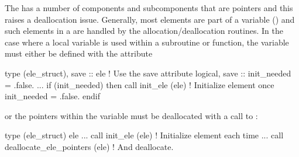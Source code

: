 The  has a number of components and subcomponents 
that are pointers and this raises a deallocation issue.
Generally, most  elements are part of a 
variable ()
and such elements in a  are handled by the
 allocation/deallocation routines. 
In the case where a local 
variable is used within a subroutine or function, the  
variable must either be defined with the  attribute 
\begin{example}
  type (ele_struct), save :: ele          ! Use the save attribute
  logical, save :: init_needed = .false.
  ...
  if (init_needed) then
    call init_ele (ele)                ! Initialize element once
    init_needed = .false.
  endif
\end{example}
or the pointers within the variable must be deallocated  with a call to
:
\begin{example}
  type (ele_struct) ele  
  ...
  call init_ele (ele)                ! Initialize element each time
  ...
  call deallocate_ele_pointers (ele) ! And deallocate.
\end{example}

